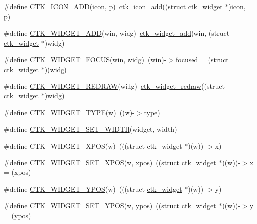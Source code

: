 \begin{DoxyCompactItemize}
\item 
\#define \hyperlink{group__ctkappfunc_gaf7b28118284aba106d0cecf49ecb7c35}{C\+T\+K\+\_\+\+I\+C\+O\+N\+\_\+\+A\+D\+D}(icon,  p)~\hyperlink{group__ctkappfunc_gafd7f717de0f57e23d03c13497b41efe4}{ctk\+\_\+icon\+\_\+add}((struct \hyperlink{structctk__widget}{ctk\+\_\+widget} $\ast$)icon, p)
\item 
\#define \hyperlink{group__ctkappfunc_gad3597b4363a6a8cfc6bd9930a99db88d}{C\+T\+K\+\_\+\+W\+I\+D\+G\+E\+T\+\_\+\+A\+D\+D}(win,  widg)~\hyperlink{group__ctkappfunc_gafdd6e4493fc97e7051d39ea806ee280f}{ctk\+\_\+widget\+\_\+add}(win, (struct \hyperlink{structctk__widget}{ctk\+\_\+widget} $\ast$)widg)
\item 
\#define \hyperlink{group__ctkappfunc_gabe4435040bab8b7befbdc6c95acc42a6}{C\+T\+K\+\_\+\+W\+I\+D\+G\+E\+T\+\_\+\+F\+O\+C\+U\+S}(win,  widg)~(win)-\/$>$focused = (struct \hyperlink{structctk__widget}{ctk\+\_\+widget} $\ast$)(widg)
\item 
\#define \hyperlink{group__ctkappfunc_gaedae61032478b0371aeb3ba2d400f4ce}{C\+T\+K\+\_\+\+W\+I\+D\+G\+E\+T\+\_\+\+R\+E\+D\+R\+A\+W}(widg)~\hyperlink{group__ctkappfunc_gaa01cba13f4c9a7719ea02876c779a02a}{ctk\+\_\+widget\+\_\+redraw}((struct \hyperlink{structctk__widget}{ctk\+\_\+widget} $\ast$)widg)
\item 
\#define \hyperlink{group__ctkappfunc_ga411653541a02802275155855304bf942}{C\+T\+K\+\_\+\+W\+I\+D\+G\+E\+T\+\_\+\+T\+Y\+P\+E}(w)~((w)-\/$>$type)
\item 
\#define \hyperlink{group__ctkappfunc_gad3695405467bc256772dac63707ce9b5}{C\+T\+K\+\_\+\+W\+I\+D\+G\+E\+T\+\_\+\+S\+E\+T\+\_\+\+W\+I\+D\+T\+H}(widget,  width)
\item 
\#define \hyperlink{group__ctkappfunc_ga91ea85f7c1ab2ece2892667d22970099}{C\+T\+K\+\_\+\+W\+I\+D\+G\+E\+T\+\_\+\+X\+P\+O\+S}(w)~(((struct \hyperlink{structctk__widget}{ctk\+\_\+widget} $\ast$)(w))-\/$>$x)
\item 
\#define \hyperlink{group__ctkappfunc_ga82d97eb35829a2cbeac157b663a56a3a}{C\+T\+K\+\_\+\+W\+I\+D\+G\+E\+T\+\_\+\+S\+E\+T\+\_\+\+X\+P\+O\+S}(w,  xpos)~((struct \hyperlink{structctk__widget}{ctk\+\_\+widget} $\ast$)(w))-\/$>$x = (xpos)
\item 
\#define \hyperlink{group__ctkappfunc_gae12b957c032bbda81b6df492d74436ec}{C\+T\+K\+\_\+\+W\+I\+D\+G\+E\+T\+\_\+\+Y\+P\+O\+S}(w)~(((struct \hyperlink{structctk__widget}{ctk\+\_\+widget} $\ast$)(w))-\/$>$y)
\item 
\#define \hyperlink{group__ctkappfunc_gaf39bfc660e3ec7d6cdf616a2d02d8a5e}{C\+T\+K\+\_\+\+W\+I\+D\+G\+E\+T\+\_\+\+S\+E\+T\+\_\+\+Y\+P\+O\+S}(w,  ypos)~((struct \hyperlink{structctk__widget}{ctk\+\_\+widget} $\ast$)(w))-\/$>$y = (ypos)

\end{DoxyCompactItemize}

